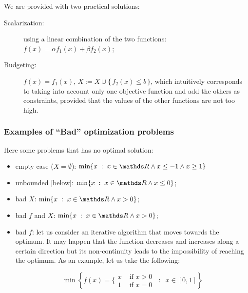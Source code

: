 \documentclass[ComputationalMathematics.tex]{subfiles}
\begin{document}
\newpage
We are provided with two practical solutions:

\begin{description}
  \item[{\sc Scalarization:}] using a linear combination of the two functions: $f(x) = \alpha f_1(x) + \beta f_2(x)$;
  \item[{\sc Budgeting:}] $f(x) = f_1(x)$, $X := X \cup \{ \, f_2(x) \leq b \, \}$, which intuitively corresponds to taking into account only one objective function and add the others as constraints, provided that the values of the other functions are not too high.
\end{description}

\subsubsection{Examples of “Bad” optimization problems}
Here some problems that has no optimal solution:
\begin{itemize}
    \item empty case ($X = \emptyset$): $\min\{ x \; : \; x \in \R \land x \leq -1 \land x \geq 1\}$
    \item unbounded [below]:  $\min\{ x \; : \; x \in \R \land x \leq 0\}$;
    \item bad $X$:  $\min\{ x \; : \; x \in \R \land x > 0\}$;
    \item bad $f$ and  $X$:  $\min\{ x \; : \; x \in \R \land x > 0\}$;
    \item bad $f$: let us consider an iterative algorithm that moves towards the optimum.
It may happen that the function decreases and increases along a certain direction but its non-continuity leads to the impossibility of reaching the optimum.
As an example, let us take the following:

\[
  \min \left\{f(x) =\bigg\{\begin{array}{ll} x & \mbox{ if } x > 0 \\
        1 & \mbox{ if } x = 0
        \end{array} \; \; : \; \; x \in [0, 1]\right\}
\]
\end{itemize}
\newpage
\end{document}
